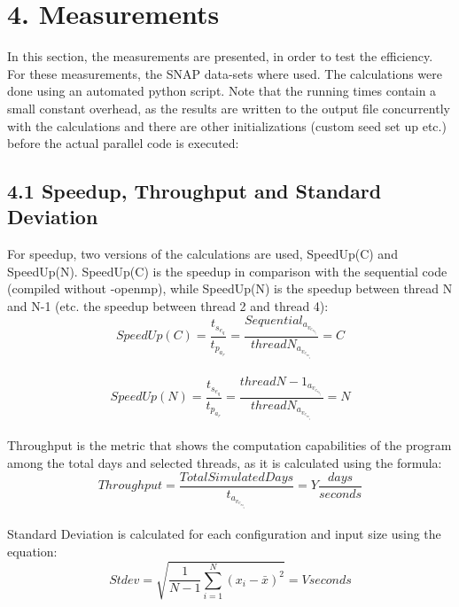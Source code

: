 \documentclass{article}
\begin{document}
\section*{4. Measurements}
In this section, the measurements are presented, in order to test the efficiency. For these measurements, the SNAP data-sets where used. The calculations were done using an automated python script. Note that the running times contain a small constant overhead, as the results are written to the output file concurrently with the calculations and there are other initializations (custom seed set up etc.) before the actual parallel code is executed:


\subsection*{4.1 Speedup, Throughput and Standard Deviation}
For speedup, two versions of the calculations are used, SpeedUp(C) and SpeedUp(N). SpeedUp(C) is the speedup in comparison with the sequential code (compiled without -openmp), while SpeedUp(N) is the speedup between thread N and N-1 (etc. the speedup between thread 2 and thread 4):
\[SpeedUp(C) = \frac{t_s_e_q}{t_p_a_r} = \frac{Sequential_a_v_e_r_a_g_e}{threadN_a_v_e_r_a_g_e} = C  \]\\
\[SpeedUp(N) = \frac{t_s_e_q}{t_p_a_r} = \frac{threadN-1_a_v_e_r_a_g_e}{threadN_a_v_e_r_a_g_e} = N   \]\\
Throughput is the metric that shows the computation capabilities of the program among the total days and selected threads, as it is calculated using the formula:
\[Throughput = \frac{TotalSimulatedDays}{t_a_v_e_r_a_g_e} = Y \frac{days}{seconds}\]\\
Standard Deviation is calculated for each configuration and input size using the equation:
\[Stdev=\sqrt{\frac{1}{N-1}\sum_{i=1}^N(x_i-\bar{x})^2}= V seconds\]\\
\end{document}
